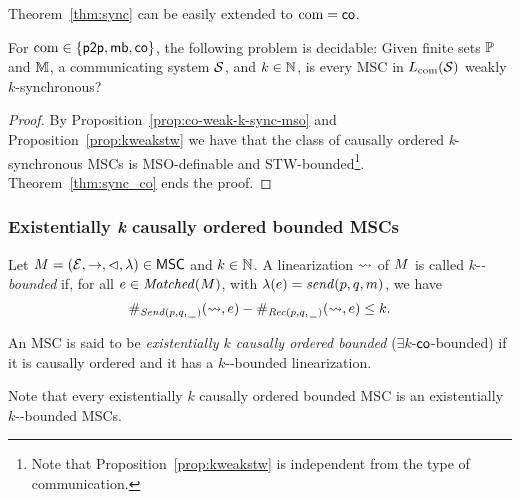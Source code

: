 \documentclass{article}
\begin{document}
Theorem~\ref{thm:sync} can be easily extended to $\textup{com} = \mathsf{co}$.

\begin{theorem}\label{thm:co-weak-k-sync}
For $\textup{com} \in \{\mathsf{p2p}, \mathsf{mb},\mathsf{co}\}$, the following problem is decidable:
Given finite sets $\mathbb{P}$ and $\mathbb{M}$, a communicating system $\mathcal{S}$, and $k \in \mathbb{N}$,
is every MSC in $L_{\textup{com}}(\mathcal{S})$ weakly $k$-synchronous?
\end{theorem}
\begin{proof}
By Proposition~\ref{prop:co-weak-k-sync-mso} and Proposition~\ref{prop:kweakstw} we have that the class of causally ordered \emph{k}-synchronous MSCs is MSO-definable and STW-bounded\footnote{Note that Proposition~\ref{prop:kweakstw} is independent from the type of communication.}. Theorem~\ref{thm:sync_co} ends the proof.
\end{proof}

\subsubsection{Existentially \emph{k} causally ordered bounded MSCs} 

\begin{definition}
Let $M = (\mathcal{E},\to,\lhd,\lambda) \in \mathsf{MSC}$ and $k \in \mathbb{N}$.
A linearization $\rightsquigarrow$ of $M$ is called
$k$-\emph{\pp-bounded} if, for all $e \in \mathit{Matched}(M)$, with $\lambda(e) = \mathit{send}(p, q, m)$, we have 
\[
\#_{{\mathit{Send}(p,q,\hspace{0.1em}\underline{\hspace{0.5em}}\hspace{0.1em})}}(\rightsquigarrow,e) - \#_{{\mathit{Rec}(p,q,\hspace{0.1em}\underline{\hspace{0.5em}}\hspace{0.1em})}}(\rightsquigarrow,e) \le k.
\]
\end{definition}

\begin{definition}\label{def:ex_k_co_bounded}
An MSC is said to be \emph{existentially $k$ causally ordered bounded} ($\exists k$-$\mathsf{co}$-bounded) if it is causally ordered and it has a $k$-\pp-bounded linearization.
\end{definition}

Note that every existentially $k$ causally ordered bounded MSC is an existentially $k$-\pp-bounded MSCs.
\end{document}
